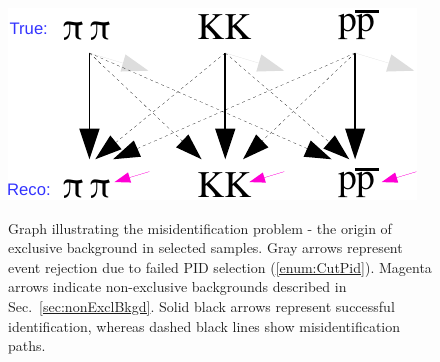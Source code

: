 \begin{figure}[h]
\centering%
\parbox{0.4725\textwidth}{%
  \centering%
  \includegraphics[width=\linewidth]{graphics/backgrounds/pid-crop2.pdf}\label{fig:misidentificationGraph}
}%
\quad%
\parbox{0.4725\textwidth}{%
    \caption[Graph illustrating the misidentification problem.]{Graph illustrating the misidentification problem - the origin of exclusive background in selected samples. Gray arrows represent event rejection due to failed PID selection (\ref{enum:CutPid}). Magenta arrows indicate non-exclusive backgrounds described in Sec.~\ref{sec:nonExclBkgd}. Solid black arrows represent successful identification, whereas dashed black lines show misidentification paths.}
}%

\end{figure}


